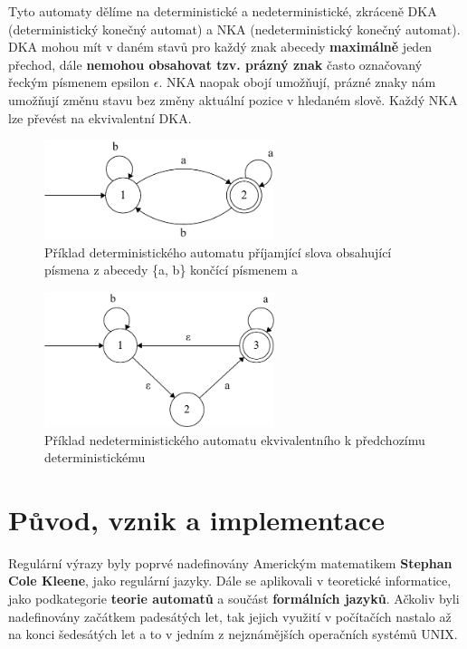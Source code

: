 Tyto automaty dělíme na deterministické a nedeterministické, zkráceně DKA (deterministický konečný automat) a NKA (nedeterministický konečný automat).
DKA mohou mít v daném stavů pro každý znak abecedy \textbf{maximálně} jeden přechod, dále \textbf{nemohou obsahovat tzv. prázný znak} často označovaný řeckým písmenem epsilon $\epsilon$.
NKA naopak obojí umožňují, prázné znaky nám umožňují změnu stavu bez změny aktuální pozice v hledaném slově. 
Každý NKA lze převést na ekvivalentní DKA.

\begin{figure}[!h]
	\centering
	\includegraphics[width=0.6\textwidth]{Figures/DFA_example.pdf}
	\caption{Příklad deterministického automatu příjamjící slova obsahující písmena z abecedy \{a, b\} končící písmenem a}
	\label{fig:DFAex}
\end{figure}

\begin{figure}[!h]
	\centering
	\includegraphics[width=0.6\textwidth]{Figures/NFA_example.pdf}
	\caption{Příklad nedeterministického automatu ekvivalentního k předchozímu deterministickému}
	\label{fig:NFAex}
\end{figure}

\section{Původ, vznik a implementace}
Regulární výrazy byly poprvé nadefinovány Americkým matematikem \textbf{Stephan Cole Kleene}, jako regulární jazyky. 
Dále se aplikovali v teoretické informatice, jako podkategorie \textbf{teorie automatů} a součást \textbf{formálních jazyků}.
Ačkoliv byli nadefinovány začátkem padesátých let, tak jejich využití v počítačích nastalo až na konci šedesátých let a to v 
jedním z nejznámějších operačních systémů UNIX.

